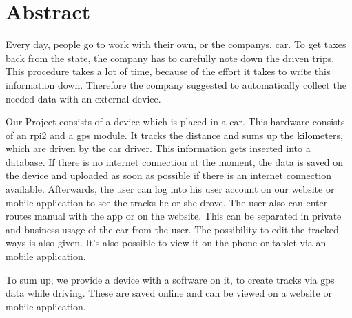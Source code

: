 \chapter*{Abstract}
Every day, people go to work with their own, or the companys, car. To get taxes back from the state, the company has to carefully note down the driven trips. This procedure takes a lot of time,  because of the effort it takes to write this information down. Therefore the company suggested to automatically collect the needed data with an external device.\newline

Our Project consists of a device which is placed in a car. This hardware consists of an \gls{rpi2} and a \gls{gps} module. It tracks the distance and sums up the kilometers, which are driven by the car driver. This information gets inserted into a database. If there is no internet connection at the moment, the data is saved on the device and uploaded as soon as possible if there is an internet connection available. Afterwards, the user can log into his user account on our website or mobile application to see the tracks he or she drove. The user also can enter routes manual with the app or on the website. This can be separated in private and business usage of the car from the user. The possibility to edit the tracked ways is also given. It's also possible to view it on the phone or tablet via an mobile application.\newline

To sum up, we provide a device with a software on it, to create tracks via \gls{gps} data while driving. These are saved online and can be viewed on a website or mobile application.
